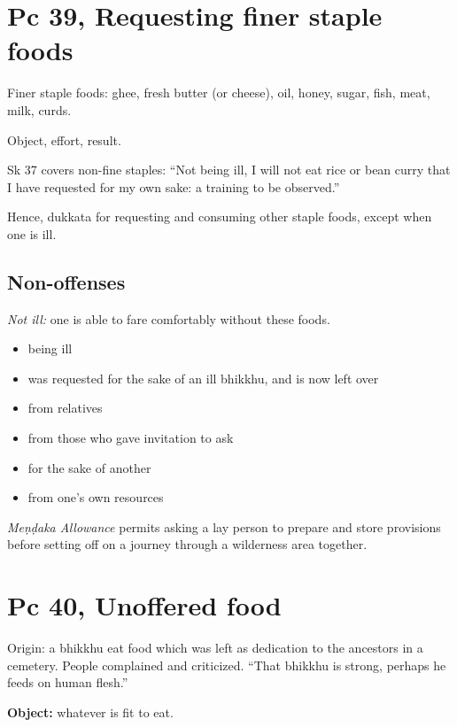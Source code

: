 \section{Pc 39, Requesting finer staple foods}

Finer staple foods: ghee, fresh butter (or cheese), oil, honey, sugar,
fish, meat, milk, curds.

Object, effort, result.

Sk 37 covers non-fine staples: ``Not being ill, I will not eat rice or
bean curry that I have requested for my own sake: a training to be
observed.''

Hence, dukkata for requesting and consuming other staple foods, except
when one is ill.

\subsection{Non-offenses}

\emph{Not ill:} one is able to fare comfortably without these foods.

\begin{multicols}{2}

\begin{itemize}
\tightlist
\item
  being ill
\item
  was requested for the sake of an ill bhikkhu, and is now left over
\item
  from relatives
\item
  from those who gave invitation to ask
\item
  for the sake of another
\item
  from one's own resources
\end{itemize}

\end{multicols}

\emph{Meṇḍaka Allowance} permits asking a lay person to prepare and
store provisions before setting off on a journey through a wilderness
area together.

\section{Pc 40, Unoffered food}

Origin: a bhikkhu eat food which was left as dedication to the ancestors
in a cemetery. People complained and criticized. ``That bhikkhu is
strong, perhaps he feeds on human flesh.''

\textbf{Object:} whatever is fit to eat.

